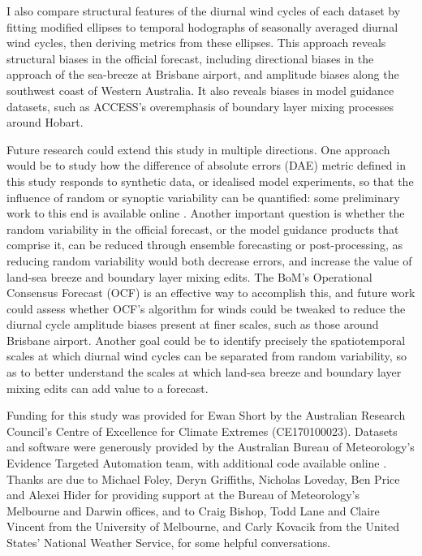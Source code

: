 \documentclass[twocol]{ametsoc}
\begin{document}
I also compare structural features of the diurnal wind cycles of each dataset by fitting modified ellipses to temporal hodographs of seasonally averaged diurnal wind cycles, then deriving metrics from these ellipses. This approach reveals structural biases in the official forecast, including directional biases in the approach of the sea-breeze at Brisbane airport, and amplitude biases along the southwest coast of Western Australia. It also reveals biases in model guidance datasets, such as ACCESS's overemphasis of boundary layer mixing processes around Hobart.   

Future research could extend this study in multiple directions. One approach would be to study how the difference of absolute errors (DAE) metric defined in this study responds to synthetic data, or idealised model experiments, so that the influence of random or synoptic variability can be quantified: some preliminary work to this end is available online \citep{short20}. Another important question is whether the random variability in the official forecast, or the model guidance products that comprise it, can be reduced through ensemble forecasting or post-processing, as reducing random variability would both decrease errors, and increase the value of land-sea breeze and boundary layer mixing edits. The BoM's Operational Consensus Forecast (OCF) is an effective way to accomplish this, and future work could assess whether OCF's algorithm for winds could be tweaked to reduce the diurnal cycle amplitude biases present at finer scales, such as those around Brisbane airport. Another goal could be to identify precisely the spatiotemporal scales at which diurnal wind cycles can be separated from random variability, so as to better understand the scales at which land-sea breeze and boundary layer mixing edits can add value to a forecast.  

\acknowledgments
Funding for this study was provided for Ewan Short by the Australian Research Council's Centre of Excellence for Climate Extremes (CE170100023). Datasets and software were generously provided by the Australian Bureau of Meteorology's Evidence Targeted Automation team, with additional code available online \citep{shortGitVeri19}. Thanks are due to Michael Foley, Deryn Griffiths, Nicholas Loveday, Ben Price and Alexei Hider for providing support at the Bureau of Meteorology's Melbourne and Darwin offices, and to Craig Bishop, Todd Lane and Claire Vincent from the University of Melbourne, and Carly Kovacik from the United States' National Weather Service, for some helpful conversations. 



\end{document}
